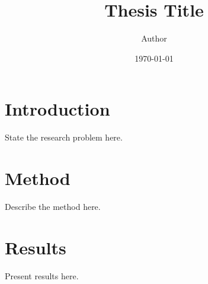 \documentclass[12pt]{report}
\title{Thesis Title}
\author{Author}
\date{\today}
\begin{document}
\maketitle
\tableofcontents

\chapter{Introduction}

State the research problem here.

\chapter{Method}

Describe the method here.

\chapter{Results}

Present results here.
\end{document}
